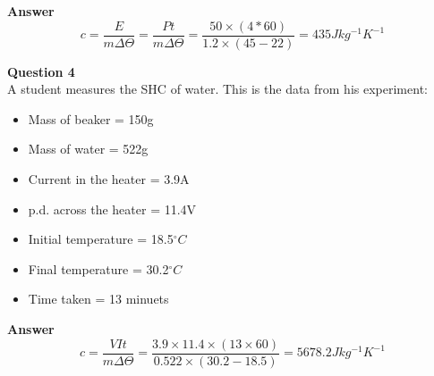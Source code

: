 \documentclass{article}
\begin{document}
\textbf{Answer}\\
\[
	c = \frac{E}{m \Delta \Theta} = \frac{Pt}{m \Delta \Theta} = \frac{50 \times (4*60)}{1.2 \times (45-22)} = 435 Jkg^{-1}K^{-1}
\]

\textbf{Question 4}\\
A student measures the SHC of water. This is the data from his experiment:
\begin{multicols}{2}
	\begin{itemize}
		\item	Mass of beaker = 150g
		\item Mass of water = 522g
		\item Current in the heater = 3.9A
		\item p.d. across the heater = 11.4V
		\item Initial temperature = 18.5$^{\circ}C$
		\item Final temperature = 30.2$^{\circ}C$
		\item Time taken = 13 minuets
	\end{itemize}
\end{multicols}

\textbf{Answer}\\
\[
	c = \frac{VIt}{m \Delta \Theta} = \frac{3.9 \times 11.4 \times (13 \times 60)}{0.522 \times (30.2-18.5)} = 5678.2 Jkg^{-1}K^{-1}
\]
\end{document}
